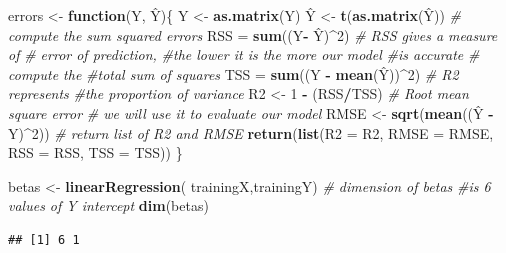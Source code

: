 \documentclass[a4paper,conference]{IEEEtran}
\newenvironment{Shaded}{\begin{snugshade}}{\end{snugshade}}
\newcommand{\AttributeTok}[1]{\textcolor[rgb]{0.13,0.29,0.53}{#1}}
\newcommand{\CommentTok}[1]{\textcolor[rgb]{0.56,0.35,0.01}{\textit{#1}}}
\newcommand{\ControlFlowTok}[1]{\textcolor[rgb]{0.13,0.29,0.53}{\textbf{#1}}}
\newcommand{\DecValTok}[1]{\textcolor[rgb]{0.00,0.00,0.81}{#1}}
\newcommand{\FunctionTok}[1]{\textcolor[rgb]{0.13,0.29,0.53}{\textbf{#1}}}
\newcommand{\NormalTok}[1]{#1}
\newcommand{\OtherTok}[1]{\textcolor[rgb]{0.56,0.35,0.01}{#1}}
\newcommand{\SpecialCharTok}[1]{\textcolor[rgb]{0.81,0.36,0.00}{\textbf{#1}}}
\begin{document}
\begin{Shaded}
\begin{Highlighting}[]
\NormalTok{errors }\OtherTok{\textless{}{-}} \ControlFlowTok{function}\NormalTok{(Y, Ŷ)\{}
\NormalTok{  Y }\OtherTok{\textless{}{-}} \FunctionTok{as.matrix}\NormalTok{(Y)}
\NormalTok{  Ŷ }\OtherTok{\textless{}{-}} \FunctionTok{t}\NormalTok{(}\FunctionTok{as.matrix}\NormalTok{(Ŷ))}
  \CommentTok{\# compute the sum squared errors}
\NormalTok{  RSS }\OtherTok{=} \FunctionTok{sum}\NormalTok{((Y}\SpecialCharTok{{-}}\NormalTok{ Ŷ)}\SpecialCharTok{\^{}}\DecValTok{2}\NormalTok{)  }
  \CommentTok{\# RSS gives a measure of }
  \CommentTok{\# error of prediction, }
  \CommentTok{\#the lower it is the more our model }
  \CommentTok{\#is accurate }
  \CommentTok{\# compute the }
  \CommentTok{\#total sum of squares}
\NormalTok{  TSS }\OtherTok{=} \FunctionTok{sum}\NormalTok{((Y }\SpecialCharTok{{-}} \FunctionTok{mean}\NormalTok{(Ŷ))}\SpecialCharTok{\^{}}\DecValTok{2}\NormalTok{)}
  \CommentTok{\# R2 represents }
  \CommentTok{\#the proportion of variance}
\NormalTok{  R2 }\OtherTok{\textless{}{-}} \DecValTok{1} \SpecialCharTok{{-}}\NormalTok{ (RSS}\SpecialCharTok{/}\NormalTok{TSS) }
  \CommentTok{\# Root mean square error }
  \CommentTok{\# we will use it to evaluate our model}
\NormalTok{  RMSE }\OtherTok{\textless{}{-}} \FunctionTok{sqrt}\NormalTok{(}\FunctionTok{mean}\NormalTok{((Ŷ }\SpecialCharTok{{-}}\NormalTok{ Y)}\SpecialCharTok{\^{}}\DecValTok{2}\NormalTok{)) }
  \CommentTok{\# return list of R2 and RMSE}
  \FunctionTok{return}\NormalTok{(}\FunctionTok{list}\NormalTok{(}\AttributeTok{R2 =}\NormalTok{ R2, }
              \AttributeTok{RMSE =}\NormalTok{ RMSE,}
              \AttributeTok{RSS =}\NormalTok{ RSS, }\AttributeTok{TSS =}\NormalTok{ TSS)) }
\NormalTok{\}}
\end{Highlighting}
\end{Shaded}

\begin{Shaded}
\begin{Highlighting}[]
\NormalTok{betas }\OtherTok{\textless{}{-}} \FunctionTok{linearRegression}\NormalTok{(}
\NormalTok{  trainingX,trainingY)}
\CommentTok{\# dimension of betas}
\CommentTok{\#is 6 values of Y intercept}
\FunctionTok{dim}\NormalTok{(betas) }
\end{Highlighting}
\end{Shaded}

\begin{verbatim}
## [1] 6 1
\end{verbatim}
\end{document}
